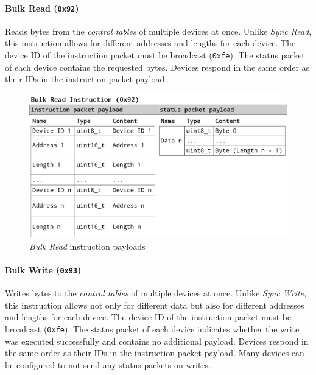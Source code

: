 \clearpage
\paragraph{Bulk Read (\lstinline{0x92})}

Reads bytes from the \textit{control tables} of multiple devices at once. Unlike \textit{Sync Read},
this instruction allows for different addresses and lengths for each device. The device ID of the
instruction packet must be broadcast (\lstinline{0xfe}). The status packet of each device contains
the requested bytes. Devices respond in the same order as their IDs in the instruction packet
payload.

\begin{figure}[H]
    \centering
    \includegraphics[scale=0.2]{img/bulk_read_packet.png}
    \caption{\textit{Bulk Read} instruction payloads}
\end{figure}

\clearpage
\paragraph{Bulk Write (\lstinline{0x93})}

Writes bytes to the \textit{control tables} of multiple devices at once. Unlike \textit{Sync Write},
this instruction allows not only for different data but also for different addresses and lengths for
each device. The device ID of the instruction packet must be broadcast (\lstinline{0xfe}). The status
packet of each device indicates whether the write was executed successfully and contains no additional
payload. Devices respond in the same order as their IDs in the instruction packet payload. Many
devices can be configured to not send any status packets on writes.

